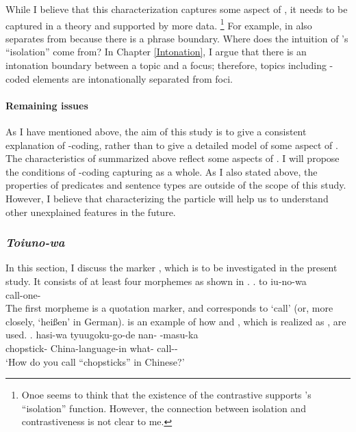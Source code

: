 While I believe that this characterization captures
some aspect of ,
it needs to be captured in a theory and supported by more data.%
 \footnote{
 Onoe seems to think that the existence of the contrastive 
 supports 's ``isolation'' function.
 However, the connection between isolation and contrastiveness is not clear to me.
 }
For example,
 in \Last[a] also separates  from  because
there is a phrase boundary.
Where does the intuition of 's ``isolation'' come from?
In Chapter \ref{Intonation},
I argue that there is an intonation boundary between a topic and a focus;
therefore, topics including -coded elements are intonationally separated from foci.


\paragraph{Remaining issues}

As I have mentioned above,
the aim of this study is to give a consistent explanation of -coding,
rather than to give a detailed model of some aspect of .
The characteristics of  summarized above reflect some aspects of .
I will propose the conditions of -coding capturing  as a whole.
As I also stated above,
the properties of predicates and sentence types are outside of the scope of this study.
However, I believe that characterizing the particle  will help us to understand other unexplained features in the future.

\subsubsection{\textit{Toiuno-wa}}\label{Back:GeneralChar:Toiunowa}

In this section,
I discuss the marker ,
which is to be investigated in the present study.
It consists of at least four morphemes as shown in \Next.
%
\exg. to iu-no-wa \\
	 call-one- \\

The first morpheme  is a quotation marker,
and  corresponds to `call' (or, more closely, `hei{\ss}en' in German).
\Next is an example of how  and , which is realized as , are used.
%
\exg. hasi-wa tyuugoku-go-de nan- -masu-ka \\
		chopstick- China-language-in what- call-- \\
		`How do you call ``chopsticks'' in Chinese?'
		\hfill{\cite[][p.\ 81]{masuokatakubo92}}

